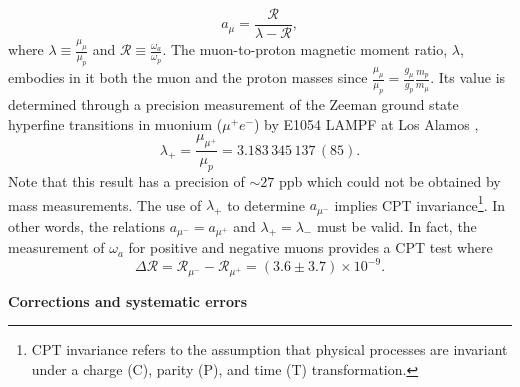 \documentclass{outhesis}
\begin{document}
\begin{equation}
a_{\mu} = \frac{\mathcal{R}}{\lambda - \mathcal{R}},
\label{eq:R}
\end{equation}
where $\displaystyle \lambda \equiv \frac{\mu_{\mu}}{\mu_{p}}$ and $\displaystyle \mathcal{R} \equiv \frac{\omega_a}{\omega_p}$.
The muon-to-proton magnetic moment ratio, $\lambda$, embodies in it both the muon and the proton masses since $\displaystyle \frac{\mu_{\mu}}{\mu_{p}} = \frac{g_{\mu}}{g_p}\frac{m_p}{m_{\mu}}$. Its value is determined through a precision measurement of the Zeeman ground state hyperfine transitions in muonium ($\mu^+e^-$) by E1054 LAMPF at Los Alamos \cite{zeeman},
\[\lambda_+ = \frac{\mu_{\mu^+}}{\mu_{p}} = 3.183\, 345\, 137\, (85).\] %
Note that this result has a precision of $\sim 27$ ppb which could not be obtained by mass measurements. The use of $\lambda_+$ to determine $a_{\mu^-}$ implies CPT invariance\footnote{CPT invariance refers to the assumption that physical processes are invariant under a charge (C), parity (P), and time (T) transformation.}. In other words, the relations $a_{\mu^-} = a_{\mu^+}$ and $\lambda_+ = \lambda_-$ must be valid. In fact, the measurement of $\omega_a$ for positive and negative muons provides a CPT test where 
\begin{equation}
\Delta \mathcal{R} = \mathcal{R}_{\mu^-} - \mathcal{R}_{\mu^+} = \left(3.6 \pm 3.7 \right) \times 10^{-9}.
\end{equation}

\textbf{Corrections and systematic errors}
\end{document}
